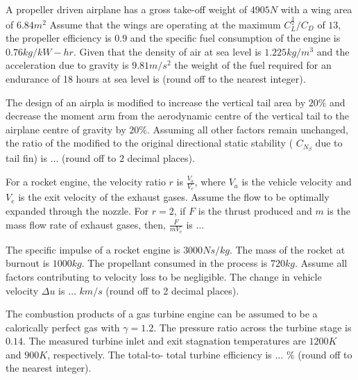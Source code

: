 \iffalse
	\chapter{2019}
	\author{AI24BTECH11001}
	\section{ae}
\fi	
    \item A propeller driven airplane has a gross take-off weight of $4905 N$ with a wing area of $6.84 m^2$ Assume that the wings are operating at the maximum $C_{L}^{\frac{3}{2}} / C_{D}$ of $13$, the propeller efficiency is $0.9$ and the specific fuel consumption of the engine is $0.76 kg/kW-hr$. Given that the density of air at sea level is $1.225kg/m^3$ and the acceleration due to gravity is $9.81 m/s^2$ the weight of the fuel required for an endurance of 18 hours at sea level is (round off to the nearest integer).

    \item The design of an airpla is modified to increase the vertical tail area by $20 \%$ and decrease the moment arm from the aerodynamic centre of the vertical tail to the airplane centre of gravity by $20 \%$. Assuming all other factors remain unchanged, the ratio of the modified to the original directional static stability ( $C_{N_\beta}$ due to tail fin) is $\dots$ (round off to $2$ decimal places).

    \item For a rocket engine, the velocity ratio $r$ is $\frac{V_a}{V_e}$, where $V_a$ is the vehicle velocity and $V_e$ is the exit velocity of the exhaust gases. Assume the flow to be optimally expanded through the nozzle. For $r = 2$, if $F$ is the thrust produced and $m$ is the mass flow rate of exhaust gases, then, $\frac{F}{mV_e}$ is $\dots$

    \item The specific impulse of a rocket engine is $3000 Ns/kg$. The mass of the rocket at burnout is $1000 kg$. The propellant consumed in the process is $720 kg$. Assume all factors contributing to velocity loss to be negligible. The change in vehicle velocity $\Delta u$ is $\dots$ $km/s$ (round off to 2 decimal places).

    \item The combustion products of a gas turbine engine can be assumed to be a calorically perfect gas with $\gamma = 1.2$. The pressure ratio across the turbine stage is $0.14$. The measured turbine inlet and exit stagnation temperatures are $1200 K$ and $900 K$, respectively. The total-to- total turbine efficiency is $\dots$ $\%$ (round off to the nearest integer).

